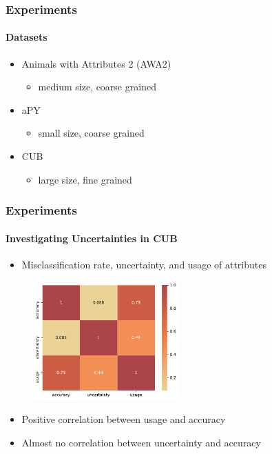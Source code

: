 \documentclass[9pt]{beamer}
\begin{document}
\begin{frame}
\frametitle{Experiments}
\framesubtitle{Datasets}
\begin{itemize}
	\item Animals with Attributes 2 (AWA2)
	\begin{itemize}
		\item medium size, coarse grained
	\end{itemize}
	\item aPY
	\begin{itemize}
		\item small size, coarse grained
	\end{itemize}	
	\item CUB
	\begin{itemize}
		\item large size, fine grained
	\end{itemize}
\end{itemize}
\end{frame}



\begin{frame}	
\frametitle{Experiments}
\framesubtitle{Investigating Uncertainties in CUB}
\begin{itemize}
	\item Misclassification rate, uncertainty, and usage of attributes
\end{itemize} 
	\begin{figure}
		\centering
		\includegraphics[width=0.5\textwidth]{images/corr_matrix.pdf}
	\end{figure}
	\begin{itemize}
		\item Positive correlation between usage and accuracy
		\item Almost no correlation between uncertainty and accuracy
	\end{itemize}
\end{frame}
\end{document}
